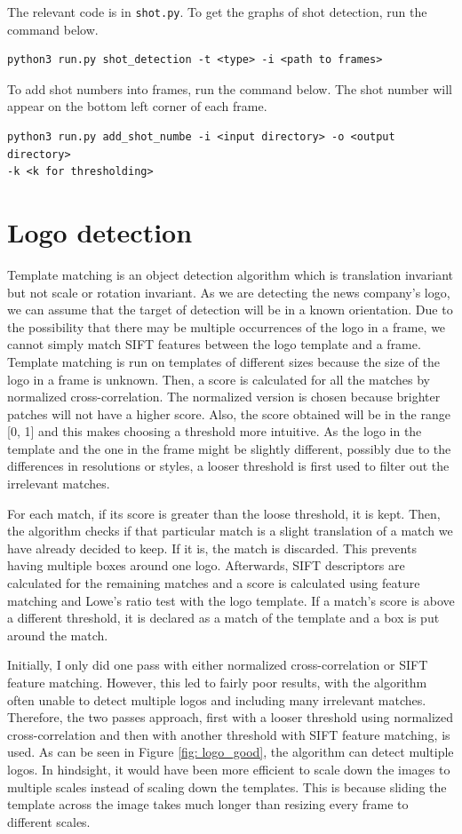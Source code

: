 \documentclass{article}
\begin{document}
The relevant code is in \texttt{shot.py}. To get the graphs of shot detection, run the command below. 
\begin{verbatim}
python3 run.py shot_detection -t <type> -i <path to frames>
\end{verbatim}

To add shot numbers into frames, run the command below. The shot number will appear on the bottom left corner of each frame.
\begin{verbatim}
python3 run.py add_shot_numbe -i <input directory> -o <output directory> 
-k <k for thresholding>
\end{verbatim}

\section{Logo detection}
Template matching is an object detection algorithm which is translation invariant but not scale or rotation invariant. As we are detecting the news company's logo, we can assume that the target of detection will be in a known orientation. Due to the possibility that there may be multiple occurrences of the logo in a frame, we cannot simply match SIFT features between the logo template and a frame. Template matching is run on templates of different sizes because the size of the logo in a frame is unknown. Then, a score is calculated for all the matches by normalized cross-correlation. The normalized version is chosen because brighter patches will not have a higher score. Also, the score obtained will be in the range [0, 1] and this makes choosing a threshold more intuitive. As the logo in the template and the one in the frame might be slightly different, possibly due to the differences in resolutions or styles, a looser threshold is first used to filter out the irrelevant matches. 

For each match, if its score is greater than the loose threshold, it is kept. Then, the algorithm checks if that particular match is a slight translation of a match we have already decided to keep. If it is, the match is discarded. This prevents having multiple boxes around one logo. Afterwards, SIFT descriptors are calculated for the remaining matches and a score is calculated using feature matching and Lowe's ratio test with the logo template. If a match's score is above a different threshold, it is declared as a match of the template and a box is put around the match.

Initially, I only did one pass with either normalized cross-correlation or SIFT feature matching. However, this led to fairly poor results, with the algorithm often unable to detect multiple logos and including many irrelevant matches. Therefore, the two passes approach, first with a looser threshold using normalized cross-correlation and then with another threshold with SIFT feature matching, is used. As can be seen in Figure \ref{fig: logo_good}, the algorithm can detect multiple logos. In hindsight, it would have been more efficient to scale down the images to multiple scales instead of scaling down the templates. This is because sliding the template across the image takes much longer than resizing every frame to different scales.
\end{document}
